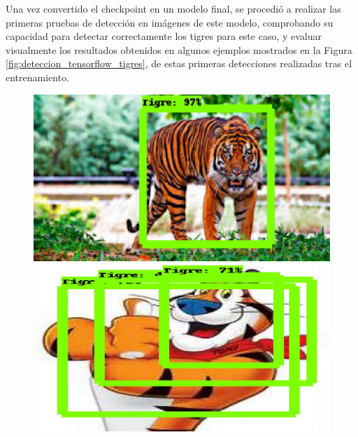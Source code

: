 Una vez convertido el checkpoint en un modelo final, se procedió a realizar las primeras pruebas de detección en imágenes de este modelo, comprobando su capacidad para detectar correctamente los tigres para este caso, y evaluar visualmente los resultados obtenidos en algunos ejemplos mostrados en la Figura \ref{fig:deteccion_tensorflow_tigres}, de estas primeras detecciones realizadas tras el entrenamiento.

  \begin{figure}[H]
  \centering
  \begin{minipage}{0.46\textwidth}
    \centering
    \includegraphics[width=\linewidth]{figs/tigre_1.jpeg}
  \end{minipage}
  \hspace{2mm}
  \begin{minipage}{0.46\textwidth}
    \centering
    \includegraphics[width=\linewidth]{figs/tigre_2.jpeg}
  \end{minipage}
  \\[4mm] %
  \begin{minipage}{0.46\textwidth}

\end{minipage}
\end{figure}
